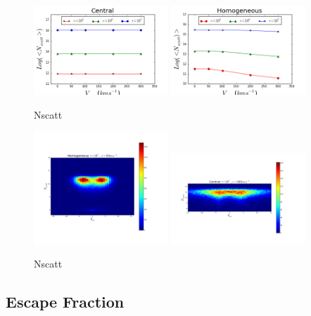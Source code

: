 \documentclass[usenatbib]{mn2e}
\begin{document}
\begin{figure}[ht]
    \includegraphics[width=0.45\textwidth]{NscattCentral.png}
    \includegraphics[width=0.45\textwidth]{NscattHOM.png}
\caption{Nscatt\label{fig:Nscatt}} 
\end{figure}

\begin{figure}[ht]
    \includegraphics[width=0.45\textwidth]{2dHistogram50Central5t.png}
    \includegraphics[width=0.45\textwidth]{2dHistogram300Central5t.png}
\caption{Nscatt\label{fig:NscattHisto}} 
\end{figure}



\subsection{Escape Fraction}
\label{sec:EF}
\end{document}
